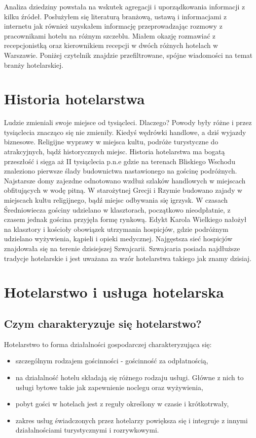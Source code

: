 \documentclass[a4paper,onecolumn,oneside,11pt,wide,floatssmall]{mwrep}
\theoremstyle{definition}
\theoremstyle{plain}%
\theoremstyle{remark}
\begin{document}
Analiza dziedziny powstała na wskutek agregacji i uporządkowania informacji 
z kilku źródeł. Posłużyłem się literaturą branżową, ustawą i informacjami z 
internetu jak również uzyskałem informację przeprowadzając rozmowy z 
pracownikami hotelu na różnym szczeblu. Miałem okazję rozmawiać z 
recepcjonistką oraz kierownikiem recepcji w dwóch różnych hotelach w 
Warszawie. Poniżej czytelnik znajdzie przefiltrowane, spójne wiadomości na temat branży hotelarskiej.


\section{Historia hotelarstwa} 

Ludzie zmieniali swoje miejsce od tysiącleci. Dlaczego? Powody były różne i 
przez tysiąclecia znacząco się nie zmieniły. Kiedyś wędrówki handlowe, a 
dziś wyjazdy biznesowe. Religijne wyprawy w miejsca kultu, podróże 
turystyczne do atrakcyjnych, bądź historycznych miejsc.     Historia 
hotelarstwa ma bogatą przeszłość i sięga aż II tysiąclecia p.n.e gdzie na 
terenach Bliskiego Wschodu znaleziono pierwsze ślady budownictwa 
nastawionego na gościnę podróżnych. Najstarsze domy zajezdne odnotowano 
wzdłuż szlaków handlowych w miejscach obfitujących w wodę pitną. W 
starożytnej Grecji i Rzymie budowano zajady w miejscach kultu religijnego, 
bądź miejsc odbywania się igrzysk. W czasach Średniowiecza gościny udzielano 
w klasztorach, początkowo nieodpłatnie, z czasem jednak gościna przyjęła 
formę rynkową. Edykt Karola Wielkiego nałożył na klasztory i kościoły 
obowiązek utrzymania hospicjów, gdzie podróżnym udzielano wyżywienia, 
kąpieli i opieki medycznej. Najgęstsza sieć hospicjów znajdowała się na 
terenie dzisiejszej Szwajcarii. Szwajcaria posiada najdłuższe tradycje 
hotelarskie i jest uważana za wzór hotelarstwa takiego jak znamy dzisiaj.


\section{Hotelarstwo i usługa hotelarska}

\subsection{Czym charakteryzuje się hotelarstwo?}

Hotelarstwo to forma działalności gospodarczej charakteryzująca się:
\begin{itemize} 
  \item szczególnym rodzajem gościnności - gościnność za odpłatnością,
  \item na działalność hotelu składają się różnego rodzaju usługi. Główne z 
  nich to usługi bytowe takie jak zapewnienie noclegu oraz wyżywienia,
  \item pobyt gości w hotelach jest z reguły określony w czasie i 
  krótkotrwały,
  \item zakres usług świadczonych przez hotelarzy powiększa się i integruje 
  z innymi działalnościami turystycznymi i rozrywkowymi.
\end{itemize}
\end{document}
